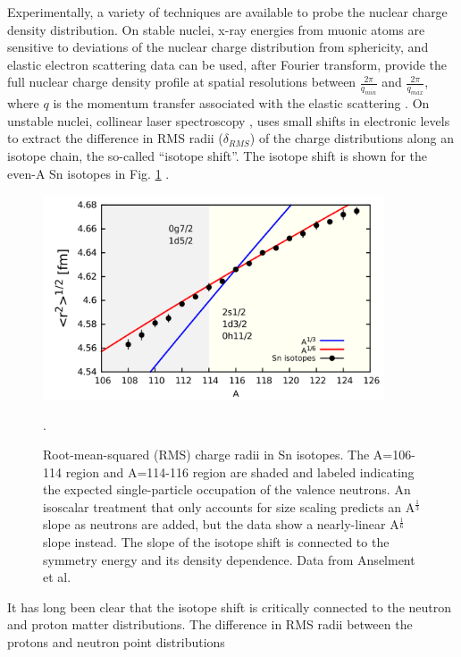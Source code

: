 Experimentally, a variety of techniques are available to probe the nuclear
charge density distribution. On stable nuclei, x-ray energies from muonic atoms
\cite{Fricke2004} are sensitive to deviations of the nuclear charge
distribution from sphericity, and elastic electron
scattering data can be used, after Fourier transform, provide the full nuclear
charge density profile at spatial resolutions between $\frac{2\pi}{q_{min}}$ and
$\frac{2\pi}{q_{max}}$, where $q$ is the momentum transfer associated with the
elastic scattering \cite{DeVries1987}.
On unstable nuclei, collinear laser spectroscopy \cite{Miller2019},
uses small shifts in electronic levels to extract
the difference in RMS radii ($\delta_{RMS}$) of the charge
distributions along an isotope chain, the so-called ``isotope shift''.
The isotope shift is shown for the even-A Sn isotopes in Fig.
\ref{SnIsotopeShift} \cite{Anselment1986}.
\begin{figure}[tb]
    \centering
    \includegraphics[width=0.9\textwidth]{figures/SnIsotopeRMSRadii.png}
    \caption[Root-mean-squared charge radii of Sn isotopes]
    {
        Root-mean-squared (RMS) charge radii in Sn isotopes.
        The A=106-114 region and A=114-116 region are shaded and labeled
    indicating the expected single-particle occupation of the valence neutrons.
    An isoscalar treatment that only accounts for size scaling predicts an
    A$^{\frac{1}{3}}$ slope as neutrons are added, but the data show a nearly-linear
A$^{\frac{1}{6}}$ slope instead. The slope of the isotope shift is connected to the symmetry energy
and its density dependence. Data from Anselment et al. \cite{Anselment1986}}.
    \label{SnIsotopeShift}
\end{figure}
It has long been clear that the 
isotope shift is critically connected to the neutron and proton matter distributions.
The difference in RMS radii between the protons and neutron point distributions
